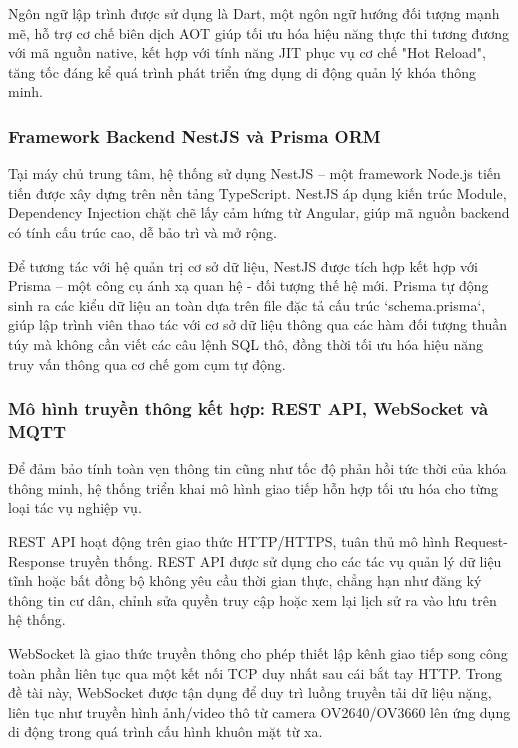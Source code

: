 Ngôn ngữ lập trình được sử dụng là Dart, một ngôn ngữ hướng đối tượng mạnh mẽ, hỗ trợ cơ chế biên dịch AOT giúp tối ưu hóa hiệu năng thực thi tương đương với mã nguồn native, kết hợp với tính năng JIT phục vụ cơ chế "Hot Reload", tăng tốc đáng kể quá trình phát triển ứng dụng di động quản lý khóa thông minh.

\subsubsection{Framework Backend NestJS và Prisma ORM}
Tại máy chủ trung tâm, hệ thống sử dụng NestJS – một framework Node.js tiến tiến được xây dựng trên nền tảng TypeScript. NestJS áp dụng kiến trúc Module, Dependency Injection chặt chẽ lấy cảm hứng từ Angular, giúp mã nguồn backend có tính cấu trúc cao, dễ bảo trì và mở rộng.

Để tương tác với hệ quản trị cơ sở dữ liệu, NestJS được tích hợp kết hợp với Prisma – một công cụ ánh xạ quan hệ - đối tượng thế hệ mới. Prisma tự động sinh ra các kiểu dữ liệu an toàn dựa trên file đặc tả cấu trúc `schema.prisma`, giúp lập trình viên thao tác với cơ sở dữ liệu thông qua các hàm đối tượng thuần túy mà không cần viết các câu lệnh SQL thô, đồng thời tối ưu hóa hiệu năng truy vấn thông qua cơ chế gom cụm tự động.

\subsubsection{Mô hình truyền thông kết hợp: REST API, WebSocket và MQTT}
Để đảm bảo tính toàn vẹn thông tin cũng như tốc độ phản hồi tức thời của khóa thông minh, hệ thống triển khai mô hình giao tiếp hỗn hợp tối ưu hóa cho từng loại tác vụ nghiệp vụ.

REST API hoạt động trên giao thức HTTP/HTTPS, tuân thủ mô hình Request-Response truyền thống. REST API được sử dụng cho các tác vụ quản lý dữ liệu tĩnh hoặc bất đồng bộ không yêu cầu thời gian thực, chẳng hạn như đăng ký thông tin cư dân, chỉnh sửa quyền truy cập hoặc xem lại lịch sử ra vào lưu trên hệ thống.

WebSocket là giao thức truyền thông cho phép thiết lập kênh giao tiếp song công toàn phần liên tục qua một kết nối TCP duy nhất sau cái bắt tay HTTP. Trong đề tài này, WebSocket được tận dụng để duy trì luồng truyền tải dữ liệu nặng, liên tục như truyền hình ảnh/video thô từ camera OV2640/OV3660 lên ứng dụng di động trong quá trình cấu hình khuôn mặt từ xa.

